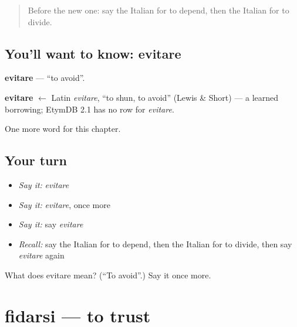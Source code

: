 \label{lesson:IT-C179-evitare}



\begin{quote}
Before the new one: say the Italian for to depend, then the Italian for to divide.
\end{quote}

\subsection*{You'll want to know: evitare}
\textbf{evitare} — \textquotedblleft{}to avoid\textquotedblright{}.

\begin{cousinweb}
\textbf{evitare} $\leftarrow$ Latin \emph{evitare}, \textquotedblleft{}to shun, to avoid\textquotedblright{} (Lewis \& Short) — a learned borrowing; EtymDB 2.1 has no row for \emph{evitare}.
\end{cousinweb}

\begin{grammarlens}[title={What you've built}]
One more word for this chapter.
\end{grammarlens}

\subsection*{Your turn}
\begin{itemize}
\raggedright
  \item \emph{Say it:} \emph{evitare}
  \item \emph{Say it:} \emph{evitare}, once more
  \item \emph{Say it:} say \emph{evitare}
  \item \emph{Recall:} say the Italian for to depend, then the Italian for to divide, then say \emph{evitare} again
\end{itemize}

\begin{tcolorbox}[breakable,colback=teal!4,colframe=teal!35!black,title={Before you move on}]
What does evitare mean? (\textquotedblleft{}To avoid\textquotedblright{}.) Say it once more.
\end{tcolorbox}
\section[fidarsi]{fidarsi — to trust}

\label{lesson:IT-C179-fidarsi}



